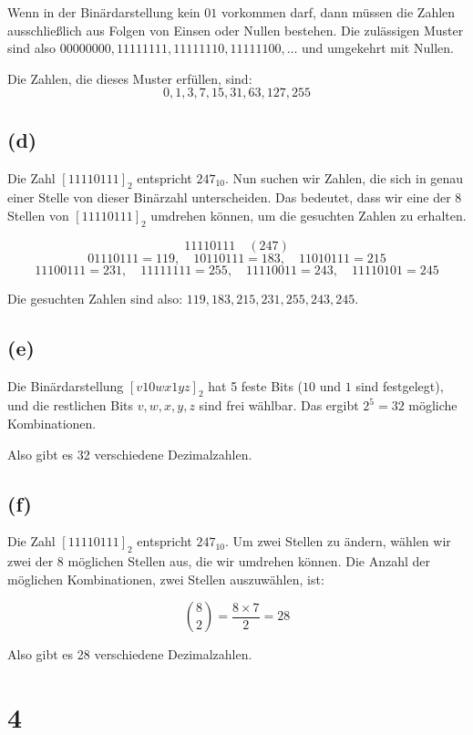 \documentclass[a4paper]{scrartcl}
\begin{document}
Wenn in der Binärdarstellung kein $01$ vorkommen darf, dann müssen die Zahlen ausschließlich aus Folgen von Einsen oder Nullen bestehen. Die zulässigen Muster sind also $00000000, 11111111, 11111110, 11111100, \dots$ und umgekehrt mit Nullen.

Die Zahlen, die dieses Muster erfüllen, sind:
\[
0, 1, 3, 7, 15, 31, 63, 127, 255
\]

\subsection*{(d)}

Die Zahl $[11110111]_2$ entspricht $247_{10}$. Nun suchen wir Zahlen, die sich in genau einer Stelle von dieser Binärzahl unterscheiden. Das bedeutet, dass wir eine der 8 Stellen von $[11110111]_2$ umdrehen können, um die gesuchten Zahlen zu erhalten.

\[
11110111 \quad (247)
\]
\[
01110111 = 119, \quad 10110111 = 183, \quad 11010111 = 215
\]
\[
11100111 = 231, \quad 11111111 = 255, \quad 11110011 = 243, \quad 11110101 = 245
\]

Die gesuchten Zahlen sind also: $119, 183, 215, 231, 255, 243, 245$.

\subsection*{(e)}

Die Binärdarstellung $[v10wx1yz]_2$ hat 5 feste Bits ($10$ und $1$ sind festgelegt), und die restlichen Bits $v, w, x, y, z$ sind frei wählbar. Das ergibt $2^5 = 32$ mögliche Kombinationen.

Also gibt es 32 verschiedene Dezimalzahlen.

\subsection*{(f)}

Die Zahl $[11110111]_2$ entspricht $247_{10}$. Um zwei Stellen zu ändern, wählen wir zwei der 8 möglichen Stellen aus, die wir umdrehen können. Die Anzahl der möglichen Kombinationen, zwei Stellen auszuwählen, ist:

\[
\binom{8}{2} = \frac{8 \times 7}{2} = 28
\]

Also gibt es 28 verschiedene Dezimalzahlen.

\section*{4}
\end{document}
